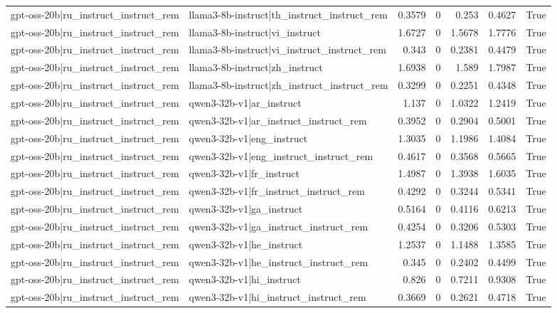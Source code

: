 \begin{table}
\begin{tabular}{l l r r r r l}
gpt-oss-20b|ru_instruct_instruct_rem & llama3-8b-instruct|th_instruct_instruct_rem & 0.3579 & 0 & 0.253 & 0.4627 & True \\
gpt-oss-20b|ru_instruct_instruct_rem & llama3-8b-instruct|vi_instruct & 1.6727 & 0 & 1.5678 & 1.7776 & True \\
gpt-oss-20b|ru_instruct_instruct_rem & llama3-8b-instruct|vi_instruct_instruct_rem & 0.343 & 0 & 0.2381 & 0.4479 & True \\
gpt-oss-20b|ru_instruct_instruct_rem & llama3-8b-instruct|zh_instruct & 1.6938 & 0 & 1.589 & 1.7987 & True \\
gpt-oss-20b|ru_instruct_instruct_rem & llama3-8b-instruct|zh_instruct_instruct_rem & 0.3299 & 0 & 0.2251 & 0.4348 & True \\
gpt-oss-20b|ru_instruct_instruct_rem & qwen3-32b-v1|ar_instruct & 1.137 & 0 & 1.0322 & 1.2419 & True \\
gpt-oss-20b|ru_instruct_instruct_rem & qwen3-32b-v1|ar_instruct_instruct_rem & 0.3952 & 0 & 0.2904 & 0.5001 & True \\
gpt-oss-20b|ru_instruct_instruct_rem & qwen3-32b-v1|eng_instruct & 1.3035 & 0 & 1.1986 & 1.4084 & True \\
gpt-oss-20b|ru_instruct_instruct_rem & qwen3-32b-v1|eng_instruct_instruct_rem & 0.4617 & 0 & 0.3568 & 0.5665 & True \\
gpt-oss-20b|ru_instruct_instruct_rem & qwen3-32b-v1|fr_instruct & 1.4987 & 0 & 1.3938 & 1.6035 & True \\
gpt-oss-20b|ru_instruct_instruct_rem & qwen3-32b-v1|fr_instruct_instruct_rem & 0.4292 & 0 & 0.3244 & 0.5341 & True \\
gpt-oss-20b|ru_instruct_instruct_rem & qwen3-32b-v1|ga_instruct & 0.5164 & 0 & 0.4116 & 0.6213 & True \\
gpt-oss-20b|ru_instruct_instruct_rem & qwen3-32b-v1|ga_instruct_instruct_rem & 0.4254 & 0 & 0.3206 & 0.5303 & True \\
gpt-oss-20b|ru_instruct_instruct_rem & qwen3-32b-v1|he_instruct & 1.2537 & 0 & 1.1488 & 1.3585 & True \\
gpt-oss-20b|ru_instruct_instruct_rem & qwen3-32b-v1|he_instruct_instruct_rem & 0.345 & 0 & 0.2402 & 0.4499 & True \\
gpt-oss-20b|ru_instruct_instruct_rem & qwen3-32b-v1|hi_instruct & 0.826 & 0 & 0.7211 & 0.9308 & True \\
gpt-oss-20b|ru_instruct_instruct_rem & qwen3-32b-v1|hi_instruct_instruct_rem & 0.3669 & 0 & 0.2621 & 0.4718 & True \\

\end{tabular}
\end{table}

